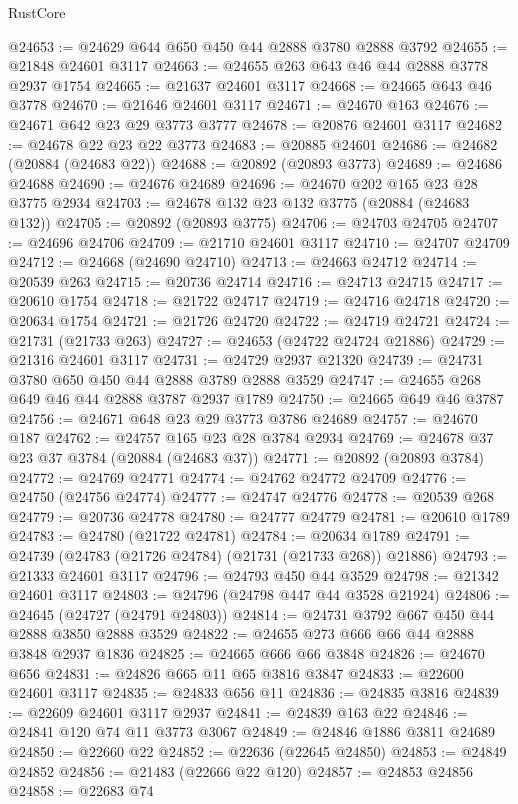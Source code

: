 \begin{lexlean}{RustCore}
\begin{coremodule}
@24653 := @24629 @644 @650 @450 @44 @2888 @3780 @2888 @3792
@24655 := @21848 @24601 @3117
@24663 := @24655 @263 @643 @46 @44 @2888 @3778 @2937 @1754
@24665 := @21637 @24601 @3117
@24668 := @24665 @643 @46 @3778
@24670 := @21646 @24601 @3117
@24671 := @24670 @163
@24676 := @24671 @642 @23 @29 @3773 @3777
@24678 := @20876 @24601 @3117
@24682 := @24678 @22 @23 @22 @3773
@24683 := @20885 @24601
@24686 := @24682 (@20884 (@24683 @22))
@24688 := @20892 (@20893 @3773)
@24689 := @24686 @24688
@24690 := @24676 @24689
@24696 := @24670 @202 @165 @23 @28 @3775 @2934
@24703 := @24678 @132 @23 @132 @3775 (@20884 (@24683 @132))
@24705 := @20892 (@20893 @3775)
@24706 := @24703 @24705
@24707 := @24696 @24706
@24709 := @21710 @24601 @3117
@24710 := @24707 @24709
@24712 := @24668 (@24690 @24710)
@24713 := @24663 @24712
@24714 := @20539 @263
@24715 := @20736 @24714
@24716 := @24713 @24715
@24717 := @20610 @1754
@24718 := @21722 @24717
@24719 := @24716 @24718
@24720 := @20634 @1754
@24721 := @21726 @24720
@24722 := @24719 @24721
@24724 := @21731 (@21733 @263)
@24727 := @24653 (@24722 @24724 @21886)
@24729 := @21316 @24601 @3117
@24731 := @24729 @2937 @21320
@24739 := @24731 @3780 @650 @450 @44 @2888 @3789 @2888 @3529
@24747 := @24655 @268 @649 @46 @44 @2888 @3787 @2937 @1789
@24750 := @24665 @649 @46 @3787
@24756 := @24671 @648 @23 @29 @3773 @3786 @24689
@24757 := @24670 @187
@24762 := @24757 @165 @23 @28 @3784 @2934
@24769 := @24678 @37 @23 @37 @3784 (@20884 (@24683 @37))
@24771 := @20892 (@20893 @3784)
@24772 := @24769 @24771
@24774 := @24762 @24772 @24709
@24776 := @24750 (@24756 @24774)
@24777 := @24747 @24776
@24778 := @20539 @268
@24779 := @20736 @24778
@24780 := @24777 @24779
@24781 := @20610 @1789
@24783 := @24780 (@21722 @24781)
@24784 := @20634 @1789
@24791 := @24739 (@24783 (@21726 @24784) (@21731 (@21733 @268)) @21886)
@24793 := @21333 @24601 @3117
@24796 := @24793 @450 @44 @3529
@24798 := @21342 @24601 @3117
@24803 := @24796 (@24798 @447 @44 @3528 @21924)
@24806 := @24645 (@24727 (@24791 @24803))
@24814 := @24731 @3792 @667 @450 @44 @2888 @3850 @2888 @3529
@24822 := @24655 @273 @666 @66 @44 @2888 @3848 @2937 @1836
@24825 := @24665 @666 @66 @3848
@24826 := @24670 @656
@24831 := @24826 @665 @11 @65 @3816 @3847
@24833 := @22600 @24601 @3117
@24835 := @24833 @656 @11
@24836 := @24835 @3816
@24839 := @22609 @24601 @3117 @2937
@24841 := @24839 @163 @22
@24846 := @24841 @120 @74 @11 @3773 @3067
@24849 := @24846 @1886 @3811 @24689
@24850 := @22660 @22
@24852 := @22636 (@22645 @24850)
@24853 := @24849 @24852
@24856 := @21483 (@22666 @22 @120)
@24857 := @24853 @24856
@24858 := @22683 @74

\end{coremodule}
\end{lexlean}
